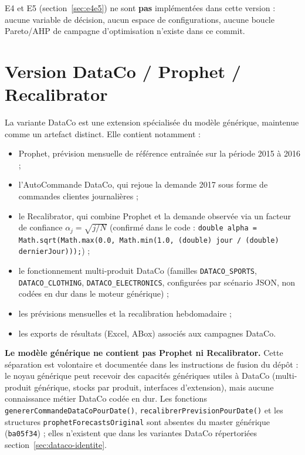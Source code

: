 \documentclass[11pt,a4paper]{article}
\newcommand{\code}[1]{\texttt{#1}}
\begin{document}
E4 et E5 (section~\ref{sec:e4e5}) ne sont \textbf{pas} implémentées dans
cette version : aucune variable de décision, aucun espace de configurations,
aucune boucle Pareto/AHP de campagne d'optimisation n'existe dans ce
commit.

\section{Version DataCo / Prophet / Recalibrator}
\label{sec:dataco-version}

La variante DataCo est une extension spécialisée du modèle générique,
maintenue comme un artefact distinct. Elle contient notamment :

\begin{itemize}
  \item Prophet, prévision mensuelle de référence entraînée sur la période 2015 à 2016 ;
  \item l'AutoCommande DataCo, qui rejoue la demande 2017 sous forme de
        commandes clientes journalières ;
  \item le Recalibrator, qui combine Prophet et la demande observée via un
        facteur de confiance $\alpha_j = \sqrt{j/N}$ (confirmé dans le code :
        \code{double alpha = Math.sqrt(Math.max(0.0, Math.min(1.0,
        (double) jour / (double) dernierJour)));}) ;
  \item le fonctionnement multi-produit DataCo (familles \code{DATACO\_\allowbreak SPORTS},
        \code{DATACO\_\allowbreak CLOTHING}, \code{DATACO\_\allowbreak ELECTRONICS}, configurées par
        scénario JSON, non codées en dur dans le moteur générique) ;
  \item les prévisions mensuelles et la recalibration hebdomadaire ;
  \item les exports de résultats (Excel, ABox) associés aux campagnes
        DataCo.
\end{itemize}

\textbf{Le modèle générique ne contient pas Prophet ni Recalibrator.} Cette
séparation est volontaire et documentée dans les instructions de fusion du
dépôt : le noyau générique peut recevoir des capacités génériques utiles à
DataCo (multi-produit générique, stocks par produit, interfaces
d'extension), mais aucune connaissance métier DataCo codée en dur. Les
fonctions \code{genererCommandeDataCoPourDate()},
\code{recalibrerPrevisionPourDate()} et les structures
\code{prophetForecastsOriginal} sont absentes du master générique
(\code{ba05f34}) ; elles n'existent que dans les variantes DataCo
répertoriées section~\ref{sec:dataco-identite}.
\end{document}
